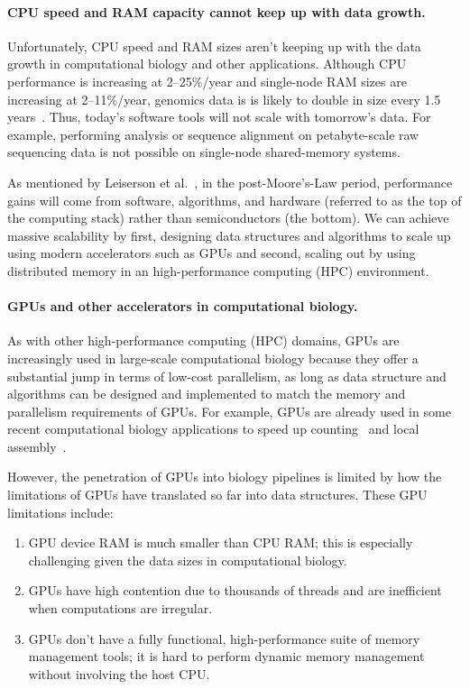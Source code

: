 \label{sec:we-need-performance-and-scalability}
\paragraph{CPU speed and RAM capacity cannot keep up with data growth.}
Unfortunately, CPU speed and RAM sizes aren't keeping up with the data growth in computational biology and other applications.
Although CPU performance is increasing at 2--25\%/year and single-node RAM sizes are increasing at 2--11\%/year, genomics data is is likely to double in size every 1.5 years~\cite{kodama2012sequence}.
Thus, today's software tools will not scale with tomorrow's data. For example, performing \kmer analysis or sequence alignment on petabyte-scale raw sequencing data is not possible on single-node shared-memory systems.

As mentioned by Leiserson et al.~\cite{leiserson2020there}, in the post-Moore’s-Law period, performance gains will come from software, algorithms, and hardware (referred to as the top of the computing stack) rather than semiconductors (the bottom). We can achieve massive scalability by first, designing data structures and algorithms to scale up using modern accelerators such as GPUs and second, scaling out by using distributed memory in an high-performance computing (HPC) environment.


\paragraph{GPUs and other accelerators in computational biology.}
As with other high-performance computing (HPC) domains,
GPUs are increasingly used in large-scale computational biology because they offer a substantial jump in terms of low-cost parallelism, as long as data structure and algorithms can be designed and implemented to match the memory and parallelism requirements of GPUs.
%
For example, GPUs are already used in some recent computational biology applications to speed up \kmer counting~\cite{nisa2021distributed} and local assembly~\cite{awan2021accelerating}.

However, the penetration of GPUs into biology pipelines is limited by how the limitations of GPUs have translated so far into data structures.  These GPU limitations include:
\begin{enumerate}[leftmargin=*,noitemsep,nolistsep]
  \item GPU device RAM is much smaller than CPU RAM\@; this is especially
    challenging given the data sizes in computational biology.
  \item GPUs have high contention due to thousands of threads and are
    inefficient when computations are irregular.
  \item GPUs don't have a fully functional, high-performance suite of memory management tools; it is hard to perform dynamic memory management without involving the host CPU\@. 
\end{enumerate}

